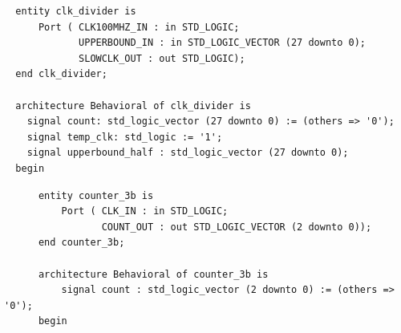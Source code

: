\documentclass[11pt]{article}
\newenvironment{code}{\captionsetup{type=listing}}{}
\begin{document}
\vspace*{1cm}

\begin{code}
	\begin{verbatim}
  entity clk_divider is
      Port ( CLK100MHZ_IN : in STD_LOGIC;
             UPPERBOUND_IN : in STD_LOGIC_VECTOR (27 downto 0);
             SLOWCLK_OUT : out STD_LOGIC);
  end clk_divider;

  architecture Behavioral of clk_divider is
    signal count: std_logic_vector (27 downto 0) := (others => '0');
    signal temp_clk: std_logic := '1';
    signal upperbound_half : std_logic_vector (27 downto 0);
  begin

  \end{verbatim}
	\captionsetup{belowskip=0pt}
	\label{code:case_io}
\end{code}

\vspace*{1cm}

\begin{code}
	\begin{verbatim}
      entity counter_3b is
          Port ( CLK_IN : in STD_LOGIC;
                 COUNT_OUT : out STD_LOGIC_VECTOR (2 downto 0));
      end counter_3b;

      architecture Behavioral of counter_3b is
          signal count : std_logic_vector (2 downto 0) := (others => '0');
      begin

  \end{verbatim}
	\captionsetup{belowskip=0pt}
	\label{code:case}

\end{code}

\vspace*{1cm}
\end{document}
